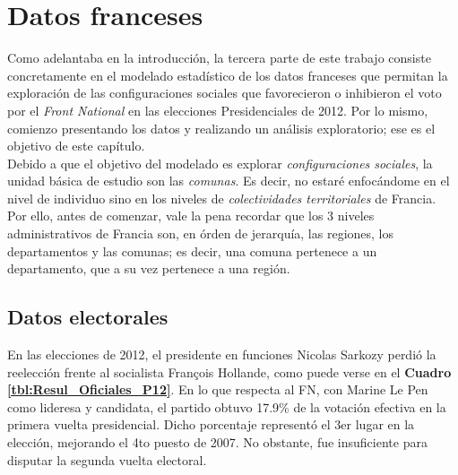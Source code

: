 \chapter{Datos franceses}

Como adelantaba en la introducción, la tercera parte de este trabajo consiste concretamente en el modelado estadístico de los datos franceses que permitan la exploración de las configuraciones sociales que favorecieron o inhibieron el voto por el \textit{Front National} en las elecciones Presidenciales de 2012. Por lo mismo, comienzo presentando los datos y realizando un análisis exploratorio; ese es el objetivo de este capítulo.\\

Debido a que el objetivo del modelado es explorar \textit{configuraciones sociales}, la unidad básica de estudio son las \textit{comunas}. Es decir, no estaré enfocándome en el nivel de individuo sino en los niveles de \textit{colectividades territoriales} de Francia. Por ello, antes de comenzar, vale la pena recordar que los 3 niveles administrativos de Francia son, en órden de jerarquía, las regiones, los departamentos y las comunas; es decir, una comuna pertenece a un departamento, que a su vez pertenece a una región.\\ 

\section{Datos electorales}

En las elecciones de 2012, el presidente en funciones Nicolas Sarkozy perdió la reelección frente al socialista François Hollande, como puede verse en el \textbf{Cuadro \ref{tbl:Resul_Oficiales_P12}}. En lo que respecta al FN, con Marine Le Pen como lideresa y candidata, el partido obtuvo 17.9\% de la votación efectiva en la primera vuelta presidencial. Dicho porcentaje representó el 3er lugar en la elección, mejorando el 4to puesto de 2007. No obstante, fue insuficiente para disputar la segunda vuelta electoral.\\

